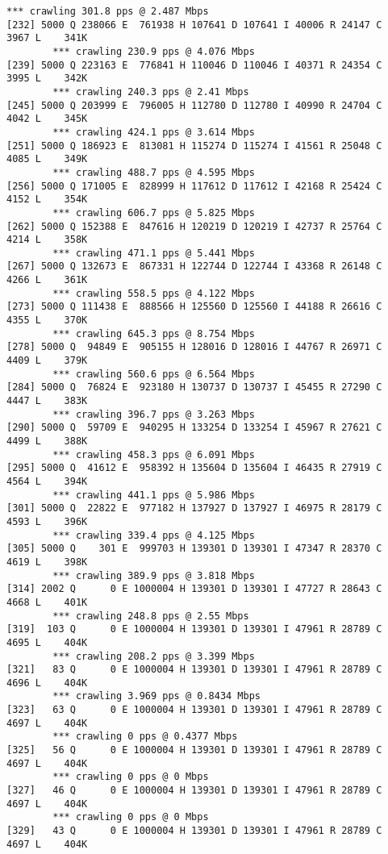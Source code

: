 \documentclass[11pt]{article}
\begin{document}
\begin{lstlisting}[label=app-trace,caption=Output of Homework 1]
        *** crawling 301.8 pps @ 2.487 Mbps
[232] 5000 Q 238066 E  761938 H 107641 D 107641 I 40006 R 24147 C  3967 L    341K
        *** crawling 230.9 pps @ 4.076 Mbps
[239] 5000 Q 223163 E  776841 H 110046 D 110046 I 40371 R 24354 C  3995 L    342K
        *** crawling 240.3 pps @ 2.41 Mbps
[245] 5000 Q 203999 E  796005 H 112780 D 112780 I 40990 R 24704 C  4042 L    345K
        *** crawling 424.1 pps @ 3.614 Mbps
[251] 5000 Q 186923 E  813081 H 115274 D 115274 I 41561 R 25048 C  4085 L    349K
        *** crawling 488.7 pps @ 4.595 Mbps
[256] 5000 Q 171005 E  828999 H 117612 D 117612 I 42168 R 25424 C  4152 L    354K
        *** crawling 606.7 pps @ 5.825 Mbps
[262] 5000 Q 152388 E  847616 H 120219 D 120219 I 42737 R 25764 C  4214 L    358K
        *** crawling 471.1 pps @ 5.441 Mbps
[267] 5000 Q 132673 E  867331 H 122744 D 122744 I 43368 R 26148 C  4266 L    361K
        *** crawling 558.5 pps @ 4.122 Mbps
[273] 5000 Q 111438 E  888566 H 125560 D 125560 I 44188 R 26616 C  4355 L    370K
        *** crawling 645.3 pps @ 8.754 Mbps
[278] 5000 Q  94849 E  905155 H 128016 D 128016 I 44767 R 26971 C  4409 L    379K
        *** crawling 560.6 pps @ 6.564 Mbps
[284] 5000 Q  76824 E  923180 H 130737 D 130737 I 45455 R 27290 C  4447 L    383K
        *** crawling 396.7 pps @ 3.263 Mbps
[290] 5000 Q  59709 E  940295 H 133254 D 133254 I 45967 R 27621 C  4499 L    388K
        *** crawling 458.3 pps @ 6.091 Mbps
[295] 5000 Q  41612 E  958392 H 135604 D 135604 I 46435 R 27919 C  4564 L    394K
        *** crawling 441.1 pps @ 5.986 Mbps
[301] 5000 Q  22822 E  977182 H 137927 D 137927 I 46975 R 28179 C  4593 L    396K
        *** crawling 339.4 pps @ 4.125 Mbps
[305] 5000 Q    301 E  999703 H 139301 D 139301 I 47347 R 28370 C  4619 L    398K
        *** crawling 389.9 pps @ 3.818 Mbps
[314] 2002 Q      0 E 1000004 H 139301 D 139301 I 47727 R 28643 C  4668 L    401K
        *** crawling 248.8 pps @ 2.55 Mbps
[319]  103 Q      0 E 1000004 H 139301 D 139301 I 47961 R 28789 C  4695 L    404K
        *** crawling 208.2 pps @ 3.399 Mbps
[321]   83 Q      0 E 1000004 H 139301 D 139301 I 47961 R 28789 C  4696 L    404K
        *** crawling 3.969 pps @ 0.8434 Mbps
[323]   63 Q      0 E 1000004 H 139301 D 139301 I 47961 R 28789 C  4697 L    404K
        *** crawling 0 pps @ 0.4377 Mbps
[325]   56 Q      0 E 1000004 H 139301 D 139301 I 47961 R 28789 C  4697 L    404K
        *** crawling 0 pps @ 0 Mbps
[327]   46 Q      0 E 1000004 H 139301 D 139301 I 47961 R 28789 C  4697 L    404K
        *** crawling 0 pps @ 0 Mbps
[329]   43 Q      0 E 1000004 H 139301 D 139301 I 47961 R 28789 C  4697 L    404K

\end{lstlisting}
\end{document}
